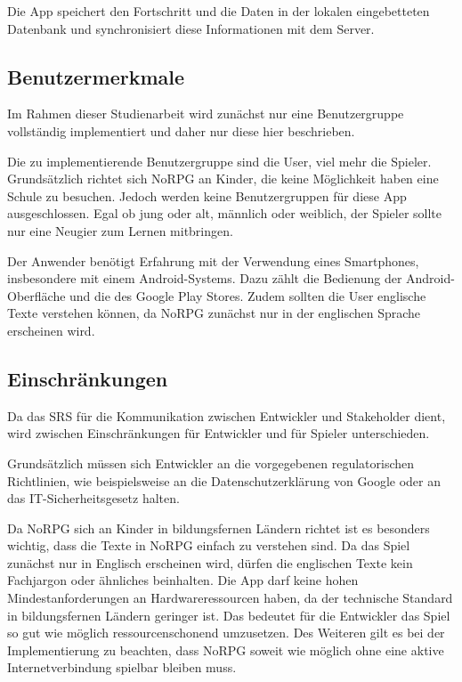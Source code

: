 		Die App speichert den Fortschritt und die Daten in der lokalen eingebetteten Datenbank und synchronisiert diese Informationen mit dem Server.
	
	\subsection{Benutzermerkmale}
		Im Rahmen dieser Studienarbeit wird zunächst nur eine Benutzergruppe vollständig implementiert und daher nur diese hier beschrieben.
		
		Die zu implementierende Benutzergruppe sind die User, viel mehr die Spieler. Grundsätzlich richtet sich NoRPG an Kinder, die keine Möglichkeit haben eine Schule zu besuchen. Jedoch werden keine Benutzergruppen für diese App ausgeschlossen. Egal ob jung oder alt, männlich oder weiblich, der Spieler sollte nur eine Neugier zum Lernen mitbringen. 
		
		Der Anwender benötigt Erfahrung mit der Verwendung eines Smartphones, insbesondere mit einem Android-Systems. Dazu zählt die Bedienung der Android-Oberfläche und die des Google Play Stores. Zudem sollten die User englische Texte verstehen können, da NoRPG zunächst nur in der englischen Sprache erscheinen wird.
			
	\subsection{Einschränkungen}
		Da das SRS für die Kommunikation zwischen Entwickler und Stakeholder dient, wird zwischen Einschränkungen für Entwickler und für Spieler unterschieden.
		
		Grundsätzlich müssen sich Entwickler an die vorgegebenen regulatorischen Richtlinien, wie beispielsweise an die Datenschutzerklärung von Google oder an das IT-Sicherheitsgesetz halten.
		
		Da NoRPG sich an Kinder in bildungsfernen Ländern richtet ist es besonders wichtig, dass die Texte in NoRPG einfach zu verstehen sind. Da das Spiel zunächst nur in Englisch erscheinen wird, dürfen die englischen Texte kein Fachjargon oder ähnliches beinhalten. Die App darf keine hohen Mindestanforderungen an Hardwareressourcen haben, da der technische Standard in bildungsfernen Ländern geringer ist. Das bedeutet für die Entwickler das Spiel so gut wie möglich ressourcenschonend umzusetzen. Des Weiteren gilt es bei der Implementierung zu beachten, dass NoRPG soweit wie möglich ohne eine aktive Internetverbindung spielbar bleiben muss.
		
